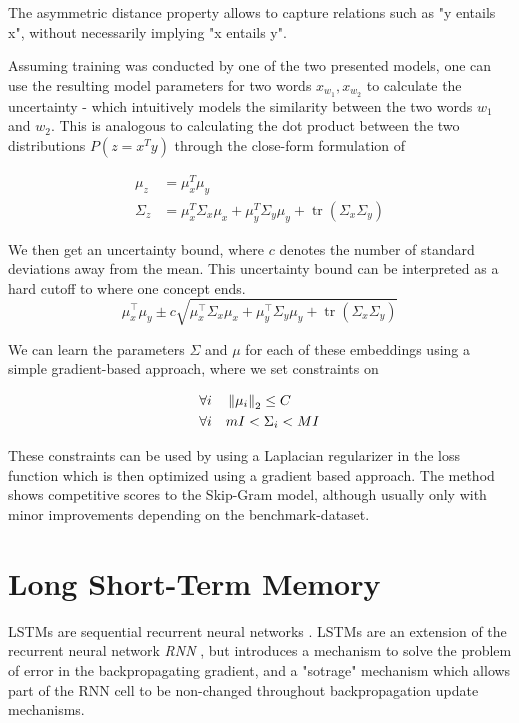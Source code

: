 \documentclass[a4paper,12pt,oneside,openright]{report}
\begin{document}
The asymmetric distance property allows to capture relations such as "y entails x", without necessarily implying "x entails y".

Assuming training was conducted by one of the two presented models,  one can use the resulting model parameters for two words $x_{w_1}, x_{w_2}$ to calculate the uncertainty - which intuitively models the similarity between the two words $w_1$ and $w_2$.
This is analogous to calculating the dot product between the two distributions $P(z=x^T y)$ through the close-form formulation of

\begin{align}
\mu_z &= \mu_x^T \mu_y \\
\Sigma_z &= \mu_{x}^T \Sigma_{x} \mu_{x}+\mu_{y}^T \Sigma_{y} \mu_{y}+\operatorname{tr}\left(\Sigma_{x} \Sigma_{y}\right)
\end{align}

We then get an uncertainty bound, where $c$ denotes the number of standard deviations away from the mean.
This uncertainty bound can be interpreted as a hard cutoff to where one concept ends.
\begin{equation}
\mu_{x}^{\top} \mu_{y} \pm c \sqrt{\mu_{x}^{\top} \Sigma_{x} \mu_{x}+\mu_{y}^{\top} \Sigma_{y} \mu_{y}+\operatorname{tr}\left(\Sigma_{x} \Sigma_{y}\right)}
\end{equation}

We can learn the parameters $\Sigma$ and $\mu$ for each of these embeddings using a simple gradient-based approach, where we set constraints on 

\begin{align}
\forall i \quad & \left\lVert \mu_i \right\rVert_2  \leq C\\
\forall i \quad & m I <  \Sigma_i < M I
\end{align}

These constraints can be used by using a Laplacian regularizer in the loss function which is then optimized using a gradient based approach. 
The method shows competitive scores to the Skip-Gram model, although usually only with minor improvements depending on the benchmark-dataset.

\section{Long Short-Term Memory}\label{appendix:LSTM}

LSTMs are sequential recurrent neural networks \cite{hochreiter97}.
LSTMs are an extension of the recurrent neural network \textit{RNN} \cite{rumelhart85}, but introduces a mechanism to solve the problem of error in the backpropagating gradient, and a "sotrage" mechanism which allows part of the RNN cell to be non-changed throughout backpropagation update mechanisms.
\end{document}

